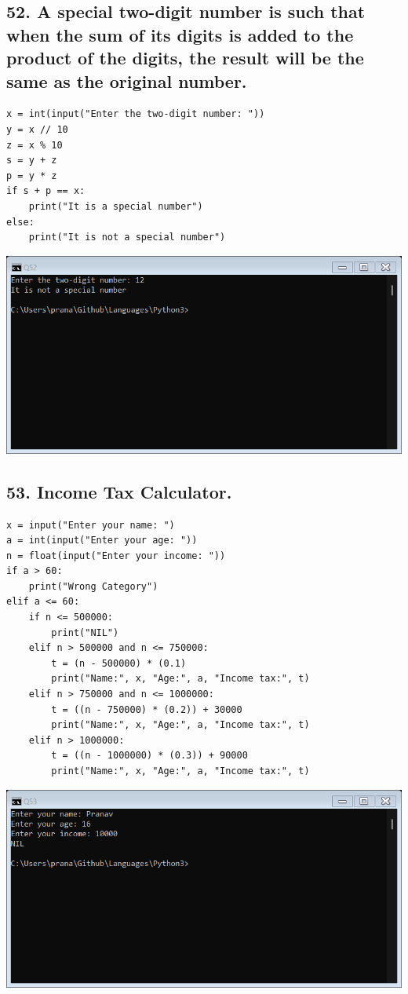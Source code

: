\documentclass[12pt]{article}
\begin{document}
\subsection*{52. A special two-digit number is such that when the sum of its digits is added to the product of the digits, the result will be the same as the original number.}
\begin{verbatim}
x = int(input("Enter the two-digit number: "))
y = x // 10
z = x % 10
s = y + z
p = y * z
if s + p == x:
    print("It is a special number")
else:
    print("It is not a special number")
\end{verbatim}
\includegraphics[width=\linewidth]{images/52.png}

\subsection*{53. Income Tax Calculator.}
\begin{verbatim}
x = input("Enter your name: ")
a = int(input("Enter your age: "))
n = float(input("Enter your income: "))
if a > 60:
    print("Wrong Category")
elif a <= 60:
    if n <= 500000:
        print("NIL")
    elif n > 500000 and n <= 750000:
        t = (n - 500000) * (0.1)
        print("Name:", x, "Age:", a, "Income tax:", t)
    elif n > 750000 and n <= 1000000:
        t = ((n - 750000) * (0.2)) + 30000
        print("Name:", x, "Age:", a, "Income tax:", t)
    elif n > 1000000:
        t = ((n - 1000000) * (0.3)) + 90000
        print("Name:", x, "Age:", a, "Income tax:", t)
\end{verbatim}
\includegraphics[width=\linewidth]{images/53.png}
\end{document}
